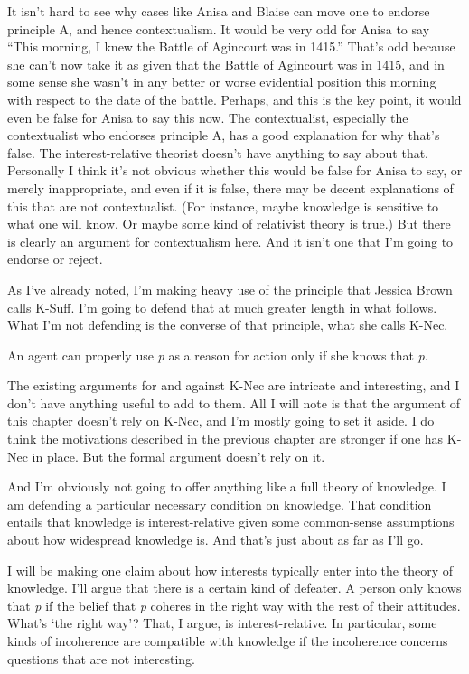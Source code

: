\documentclass[
  11pt,
]{book}
\providecommand{\tightlist}{%
  \setlength{\itemsep}{0pt}\setlength{\parskip}{0pt}}
\begin{document}
It isn't hard to see why cases like Anisa and Blaise can move one to endorse principle A, and hence contextualism. It would be very odd for Anisa to say ``This morning, I knew the Battle of Agincourt was in 1415.'' That's odd because she can't now take it as given that the Battle of Agincourt was in 1415, and in some sense she wasn't in any better or worse evidential position this morning with respect to the date of the battle. Perhaps, and this is the key point, it would even be false for Anisa to say this now. The contextualist, especially the contextualist who endorses principle A, has a good explanation for why that's false. The interest-relative theorist doesn't have anything to say about that. Personally I think it's not obvious whether this would be false for Anisa to say, or merely inappropriate, and even if it is false, there may be decent explanations of this that are not contextualist. (For instance, maybe knowledge is sensitive to what one will know. Or maybe some kind of relativist theory is true.) But there is clearly an argument for contextualism here. And it isn't one that I'm going to endorse or reject.

As I've already noted, I'm making heavy use of the principle that Jessica Brown calls K-Suff. I'm going to defend that at much greater length in what follows. What I'm not defending is the converse of that principle, what she calls K-Nec.

\begin{description}
\tightlist
\item[K-Nec]
An agent can properly use \emph{p} as a reason for action only if she knows that \emph{p}.
\end{description}

The existing arguments for and against K-Nec are intricate and interesting, and I don't have anything useful to add to them. All I will note is that the argument of this chapter doesn't rely on K-Nec, and I'm mostly going to set it aside. I do think the motivations described in the previous chapter are stronger if one has K-Nec in place. But the formal argument doesn't rely on it.

And I'm obviously not going to offer anything like a full theory of knowledge. I am defending a particular necessary condition on knowledge. That condition entails that knowledge is interest-relative given some common-sense assumptions about how widespread knowledge is. And that's just about as far as I'll go.

I will be making one claim about how interests typically enter into the theory of knowledge. I'll argue that there is a certain kind of defeater. A person only knows that \emph{p} if the belief that \emph{p} coheres in the right way with the rest of their attitudes. What's `the right way'? That, I argue, is interest-relative. In particular, some kinds of incoherence are compatible with knowledge if the incoherence concerns questions that are not interesting.
\end{document}
